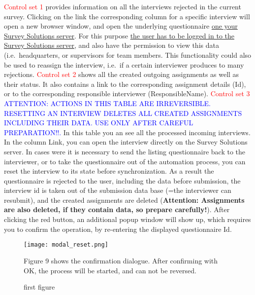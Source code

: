 \documentclass[a4paper]{article}
\begin{document}
\textcolor{red}{Control set 1} provides information on all the interviews rejected in the current survey. Clicking on the link the corresponding column for a specific interview will open a new browser window, and open the underlying questionnaire \underline{one your Survey Solutions server}. For this purpose \underline{the user has to be logged in to the Survey Solutions server}, and also have the permission to view this data (i.e.~headquarters, or supervisors for team members. This functionality could also be used to reassign the interview, i.e.~if a certain interviewer produces to many rejections. \newline
\textcolor{red}{Control set 2} shows all the created outgoing assignments as well as their status. It also contains a link to the corresponding assignment details (Id), or to the corresponding responsible interviewer (ResponsibleName). \newline
\textcolor{red}{Control set 3} \textcolor{blue}{ATTENTION: ACTIONS IN THIS TABLE ARE IRREVERSIBLE. RESETTING AN INTERVIEW DELETES ALL CREATED ASSIGNMENTS INCLUDING THEIR DATA. USE ONLY AFTER CAREFUL PREPARATION!!.} In this table you an see all the processed incoming interviews. In the column Link, you can open the interview directly on the Survey Solutions server. In cases were it is necessary to send the listing questionnaire back to the interviewer, or to take the questionnaire out of the automation process, you can reset the interview to its state before synchronization. As a result the questionnaire is rejected to the user, including the data before submission, the interview id is taken out of the submission data base (=the interviewer can resubmit), and the created assignments are deleted (\textbf{Attention: Assignments are also deleted, if they contain data, so prepare carefully!}). After clicking the red button, an additional popup window will show up, which requires you to confirm the operation, by re-entering the displayed questionnaire Id. \newline

\begin{figure}
    \centering
    \begin{minipage}{0.48\textwidth}
        \centering
        \texttt{[image: modal\_reset.png]} %
        \caption{first figure}
    \end{minipage}\hfill
    \begin{minipage}{0.48\textwidth}
        Figure 9 shows the confirmation dialogue. After confirming with OK, the process will be started, and can not be reversed.
    \end{minipage}
\end{figure}
\newpage
\newpage
\end{document}
